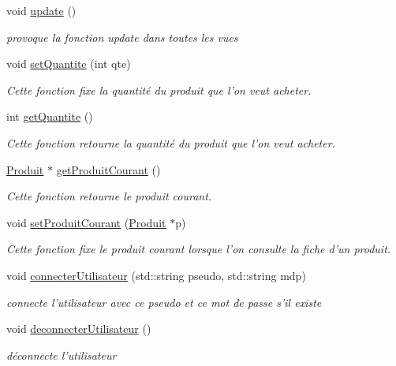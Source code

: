 \begin{DoxyCompactItemize}
void \hyperlink{class_gestion_bdd_a518211afbda535f9bcbf718254c7a6aa}{update} ()
\begin{DoxyCompactList}\small\item\em provoque la fonction update dans toutes les vues \end{DoxyCompactList}\item 
void \hyperlink{class_gestion_bdd_ae1beeb1b627cbf2e6d0b044c9821d05a}{set\-Quantite} (int qte)
\begin{DoxyCompactList}\small\item\em Cette fonction fixe la quantité du produit que l'on veut acheter. \end{DoxyCompactList}\item 
int \hyperlink{class_gestion_bdd_ad0e14c4312471baad8d525ae9c3b0952}{get\-Quantite} ()
\begin{DoxyCompactList}\small\item\em Cette fonction retourne la quantité du produit que l'on veut acheter. \end{DoxyCompactList}\item 
\hyperlink{class_produit}{Produit} $\ast$ \hyperlink{class_gestion_bdd_a247c81f14899ebdc9666f62e9da73361}{get\-Produit\-Courant} ()
\begin{DoxyCompactList}\small\item\em Cette fonction retourne le produit courant. \end{DoxyCompactList}\item 
void \hyperlink{class_gestion_bdd_acdf8fc7e874b0c24408aaf1121aafda6}{set\-Produit\-Courant} (\hyperlink{class_produit}{Produit} $\ast$p)
\begin{DoxyCompactList}\small\item\em Cette fonction fixe le produit courant lorsque l'on consulte la fiche d'un produit. \end{DoxyCompactList}\item 
void \hyperlink{class_gestion_bdd_a936ae71d7145692ec01ccb0f282d3b59}{connecter\-Utilisateur} (std\-::string pseudo, std\-::string mdp)
\begin{DoxyCompactList}\small\item\em connecte l'utilisateur avec ce pseudo et ce mot de passe s'il existe \end{DoxyCompactList}\item 
void \hyperlink{class_gestion_bdd_a0e99ded45980647e925295e8cd828004}{deconnecter\-Utilisateur} ()
\begin{DoxyCompactList}\small\item\em déconnecte l'utilisateur \end{DoxyCompactList}\item 

\end{DoxyCompactItemize}
